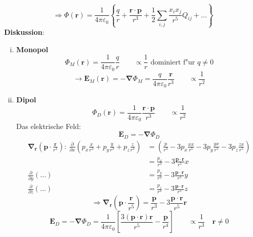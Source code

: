 \documentclass[titlepage,11pt,a4paper,ngerman]{report}
\renewcommand{\Phi}{\varPhi}
\renewcommand{\vec}[1]{\boldsymbol{#1}}
\renewcommand{\epsilon}{\varepsilon}
\begin{document}
\[\Rightarrow\Phi(\vec{r})=\frac{1}{4\pi\epsilon_0}\left\{\frac{q}{r}+\frac{\vec{r}\cdot\vec{p}}{r^3}+\frac{1}{2}\sum_{i,j}\frac{x_ix_j}{r^5}Q_{ij}+\ldots\right\}\]
\textbf{Diskussion}:
\begin{enumerate}[i)]
	\item \textbf{Monopol} \[\Phi_M(\vec{r})=\frac{1}{4\pi\epsilon_0}\frac{q}{r} \qquad \propto\frac{1}{r}\textrm{ dominiert f"ur }q\neq0\]
	\[\rightarrow\vec{E}_M(\vec{r})=-\vec{\nabla}\Phi_M=\frac{q}{4\pi\epsilon_0}\frac{\vec{r}}{r^3} \qquad \propto\frac{1}{r^2}\]
	\item \textbf{Dipol} \[\Phi_D(\vec{r})=\frac{1}{4\pi\epsilon_0}\frac{\vec{r}\cdot\vec{p}}{r^3} \qquad \propto\frac{1}{r^2}\]
	Das elektrische Feld:
	\[\vec{E}_D=-\vec{\nabla}\Phi_D\]
	\begin{align*}
	\vec{\nabla}_{\vec{r}} \left(\vec{p}\cdot\frac{\vec{r}}{r^3}\right) : \ \frac{\partial}{\partial x} \left(p_x\frac{x}{r^3}+p_y\frac{y}{r^3}+p_z\frac{z}{r^3}\right) &= \left(\frac{p}{r^3} -3 p_x \frac{xx}{r^5}-3p_y\frac{yx}{r^5} -3p_z \frac{zx}{r^5} \right)\\
	&= \frac{p_x}{r^3} -3 \frac{\vec{p}\cdot\vec{r}}{r^5}x\\
	\frac{\partial}{\partial y}(\ldots) &= \frac{p_y}{r^3}-3\frac{\vec{p}\cdot\vec{r}}{r^5}y \\
	\frac{\partial}{\partial z} (\ldots) &= \frac{p_z}{r^3} -3 \frac{\vec{p}\cdot\vec{r}}{r^5} z 
	\end{align*}
	\[\Rightarrow\vec{\nabla}_{\vec{r}}\left(\vec{p}\cdot\frac{\vec{r}}{r^5}\right)=\frac{\vec{p}}{r^3}-3\frac{\vec{p}\cdot\vec{r}}{r^5}\vec{r}\]
	$$\vec{E}_{D} = - \vec{\nabla} \Phi_D= \frac{1}{4\pi\epsilon_0} \left[\frac{3(\vec{p}\cdot\vec{r})\vec{r}}{r^5}-\frac{\vec{p}}{r^4}\right] \qquad \propto \frac{1}{r^3} \quad \vec{r}\neq0$$
	

\end{enumerate}
\end{document}
